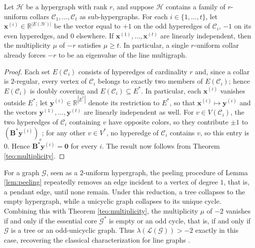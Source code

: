 \documentclass[12pt,reqno]{amsart}
\begin{document}
\begin{corollary}\label{cor:collar_general}

Let $\mathcal{H}$ be a hypergraph with rank $r$, and suppose $\mathcal{H}$ contains a family of $r$-uniform collars $\mathcal{C}_1, \dots, \mathcal{C}_t$ as sub-hypergraphs. For each $i \in \{1,\dots,t\}$, let $\mathbf{x}^{(i)} \in \mathbb{R}^{|E(\mathcal{H})|}$ be the vector equal to $+1$ on the odd hyperedges of $\mathcal{C}_i$, $-1$ on its even hyperedges, and $0$ elsewhere. If $\mathbf{x}^{(1)}, \dots, \mathbf{x}^{(t)}$ are linearly independent, then the multiplicity $\mu$ of $-r$ satisfies $\mu \geq t$. In particular, a single $r$-uniform collar already forces $-r$ to be an eigenvalue of the line multigraph.

\end{corollary}

\begin{proof}
Each set $E(\mathcal{C}_i)$ consists of hyperedges of cardinality $r$ and, since a collar is $2$-regular, every vertex of $\mathcal{C}_i$ belongs to exactly two members of $E(\mathcal{C}_i)$; hence $E(\mathcal{C}_i)$ is doubly covering and $E(\mathcal{C}_i) \subseteq E^*$. In particular, each $\mathbf{x}^{(i)}$ vanishes outside $E^*$; let $\mathbf{y}^{(i)} \in \mathbb{R}^{|E^*|}$ denote its restriction to $E^*$, so that $\mathbf{x}^{(i)} \mapsto  \mathbf{y}^{(i)}$ and the vectors $\mathbf{y}^{(1)}, \dots, \mathbf{y}^{(t)}$ are linearly independent as well. For $v\in V(\mathcal{C}_i)$, the two hyperedges of $\mathcal{C}_i$ containing $v$ have opposite colors, so they contribute $\pm1$ to $(\mathbf{B}^*\mathbf{y}^{(i)})_v$; for any other $v \in V^*$, no hyperedge of $\mathcal{C}_i$ contains $v$, so this entry is $0$. Hence $\mathbf{B}^*\mathbf{y}^{(i)} = \mathbf{0}$ for every $i$. The result now follows from Theorem \ref{teo:multiplicity}.
\end{proof}

\begin{remark}\label{rem:doob}
For a graph $\mathcal{G}$, seen as a $2$-uniform hypergraph, the peeling procedure of Lemma \ref{lem:peeling} repeatedly removes an edge incident to a vertex of degree $1$, that is, a pendant edge, until none remain. Under this reduction, a tree collapses to the empty hypergraph, while a unicyclic graph collapses to its unique cycle. Combining this with Theorem \ref{teo:multiplicity}, the multiplicity $\mu$ of $-2$ vanishes if and only if the essential core $\mathcal{G}^*$ is empty or an odd cycle, that is, if and only if $\mathcal{G}$ is a tree or an odd-unicyclic graph. Thus $\lambda(\mathcal{L}(\mathcal{G})) > -2$ exactly in this case, recovering the classical characterization for line graphs \cite{line-spec}.
\end{remark}
\end{document}
